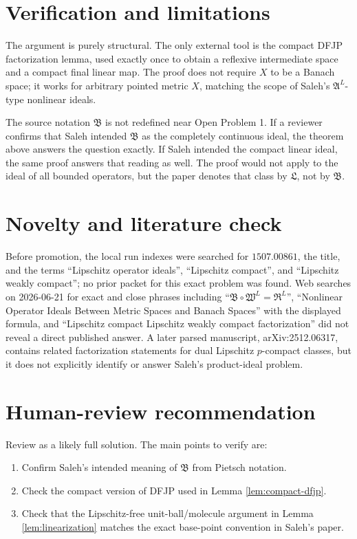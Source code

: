 \documentclass[11pt]{article}
\newcommand{\B}{\mathfrak B}
\begin{document}
\section*{Verification and limitations}

The argument is purely structural.  The only external tool is the compact DFJP factorization lemma, used exactly once to obtain a reflexive intermediate space and a compact final linear map.  The proof does not require \(X\) to be a Banach space; it works for arbitrary pointed metric \(X\), matching the scope of Saleh's \(\mathfrak A^L\)-type nonlinear ideals.

The source notation \(\B\) is not redefined near Open Problem 1.  If a reviewer confirms that Saleh intended \(\B\) as the completely continuous ideal, the theorem above answers the question exactly.  If Saleh intended the compact linear ideal, the same proof answers that reading as well.  The proof would not apply to the ideal of all bounded operators, but the paper denotes that class by \(\mathfrak L\), not by \(\B\).

\section*{Novelty and literature check}

Before promotion, the local run indexes were searched for \(1507.00861\), the title, and the terms ``Lipschitz operator ideals'', ``Lipschitz compact'', and ``Lipschitz weakly compact''; no prior packet for this exact problem was found.  Web searches on 2026-06-21 for exact and close phrases including ``\(\B\circ\mathfrak W^L=\mathfrak R^L\)'', ``Nonlinear Operator Ideals Between Metric Spaces and Banach Spaces'' with the displayed formula, and ``Lipschitz compact Lipschitz weakly compact factorization'' did not reveal a direct published answer.  A later parsed manuscript, arXiv:2512.06317, contains related factorization statements for dual Lipschitz \(p\)-compact classes, but it does not explicitly identify or answer Saleh's product-ideal problem.

\section*{Human-review recommendation}

Review as a likely full solution.  The main points to verify are:
\begin{enumerate}
\item Confirm Saleh's intended meaning of \(\mathfrak B\) from Pietsch notation.
\item Check the compact version of DFJP used in Lemma \ref{lem:compact-dfjp}.
\item Check that the Lipschitz-free unit-ball/molecule argument in Lemma \ref{lem:linearization} matches the exact base-point convention in Saleh's paper.
\end{enumerate}
\end{document}
